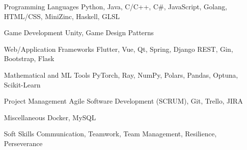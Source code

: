 

\begin{cvskills}

  \cvskill
    {Programming Languages} %
    {Python, Java, C/C++, C\#, JavaScript, Golang, HTML/CSS, MiniZinc, Haskell, GLSL} %

  \cvskill
    {Game Development} %
    {Unity, Game Design Patterns} %

  \ifbool{FullVersion}{
    \cvskill
        {GPU Programming Frameworks} %
        {CUDA and OpenACC} %
    
    \cvskill
        {Graphics Libraries} %
        {OpenGL, GLUT, GLFW, GLEW, SDL} %
  }{    
   \cvskill
    {Graphics and GPU Libraries} %
    {OpenGL, GLUT, GLFW, SDL, CUDA, OpenACC} %
  }


        

  \cvskill
    {Web/Application Frameworks} %
    {Flutter, Vue, Qt, Spring, Django REST, Gin, Bootstrap, Flask} %


  \cvskill
    {Mathematical and ML Tools} %
    {PyTorch, Ray, NumPy, Polars, Pandas, Optuna, Scikit-Learn} %

  \cvskill
    {Project Management} %
    {Agile Software Development (SCRUM), Git, Trello, JIRA} %

  \cvskill
    {Miscellaneous} %
    {Docker, MySQL} %

  \cvskill
    {Soft Skills} %
    {Communication, Teamwork, Team Management, Resilience, Perseverance} %

\end{cvskills}
